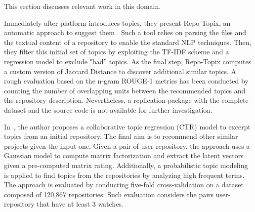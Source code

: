 This section discusses relevant work in this domain.



Immediately after \GH platform introduces topics, they present Repo-Topix, an automatic approach to suggest them \cite{ganesan_topic_2017}. Such a tool relies on parsing the \RM files and the textual content of a repository to enable the standard NLP techniques. Then, they filter this initial set of topics by exploiting the TF-IDF scheme and a regression model to exclude "bad'' topics. As the final step, Repo-Topix computes a custom version of Jaccard Distance to discover additional similar topics. A rough evaluation based on the n-gram ROUGE-1 metrics has been conducted by counting the number of overlapping units between the recommended topics and the repository description. Nevertheless, a replication package with the complete dataset and the source code is not available for further investigation.





In~\cite{orii_modeling_2013}, the author proposes a collaborative topic regression (CTR) model to excerpt topics from an initial \GH repository. The final aim is to recommend other similar projects given the input one. Given a pair of user-repository, the approach uses a Gaussian model to compute matrix factorization and extract the latent vectors given a pre-computed matrix rating. Additionally, a probabilistic topic modeling is applied to find topics from the repositories by analyzing high frequent terms. The approach is evaluated by conducting five-fold cross-validation on a dataset composed of  120,867 repositories. Such evaluation considers the pairs user-repository that have at least 3 watches. 


